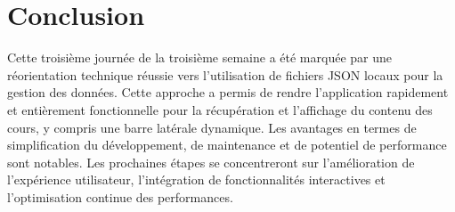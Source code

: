 \documentclass[12pt, a4paper]{article}
\begin{document}
\section{Conclusion}
Cette troisième journée de la troisième semaine a été marquée par une réorientation technique réussie vers l'utilisation de fichiers JSON locaux pour la gestion des données. Cette approche a permis de rendre l'application rapidement et entièrement fonctionnelle pour la récupération et l'affichage du contenu des cours, y compris une barre latérale dynamique. Les avantages en termes de simplification du développement, de maintenance et de potentiel de performance sont notables. Les prochaines étapes se concentreront sur l'amélioration de l'expérience utilisateur, l'intégration de fonctionnalités interactives et l'optimisation continue des performances.
\end{document}
